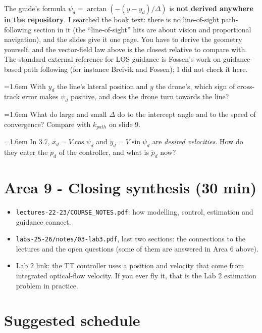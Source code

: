 \documentclass[10pt,a4paper]{article}
\newcommand{\cb}{\raisebox{-0.35ex}{\Large$\square$}}
\newcommand{\chk}[1]{\par\noindent\hangindent=1.6em\hangafter=1 \cb\hspace{0.6em}#1}
\begin{document}
\begin{warnbox}
The guide's formula $\psi_d=\arctan(-(y-y_d)/\Delta)$ is \textbf{not derived anywhere in the repository}.
I searched the book text: there is no line-of-sight path-following section in it (the ``line-of-sight'' hits are about vision and proportional navigation), and the slides give it one page.
You have to derive the geometry yourself, and the vector-field law above is the closest relative to compare with.
The standard external reference for LOS guidance is Fossen's work on guidance-based path following (for instance Breivik and Fossen); I did not check it here.
\end{warnbox}
\begin{selfcheck}
\chk{With $y_d$ the line's lateral position and $y$ the drone's, which sign of cross-track error makes $\psi_d$ positive, and does the drone turn towards the line?}
\chk{What do large and small $\Delta$ do to the intercept angle and to the speed of convergence? Compare with $k_{path}$ on slide 9.}
\chk{In 3.7, $\dot x_d=V\cos\psi_d$ and $\dot y_d=V\sin\psi_d$ are \emph{desired velocities}. How do they enter the $\dot p_d$ of the controller, and what is $\ddot p_d$ now?}
\end{selfcheck}

\section*{Area 9 - Closing synthesis (30 min)}

\begin{itemize}
\item \texttt{lectures-22-23/COURSE\_NOTES.pdf}: how modelling, control, estimation and guidance connect.
\item \texttt{labs-25-26/notes/03-lab3.pdf}, last two sections: the connections to the lectures and the open questions (some of them are answered in Area 6 above).
\item Lab 2 link: the TT controller uses a position and velocity that come from integrated optical-flow velocity. If you ever fly it, that is the Lab 2 estimation problem in practice.
\end{itemize}

\section*{Suggested schedule}
\end{document}
